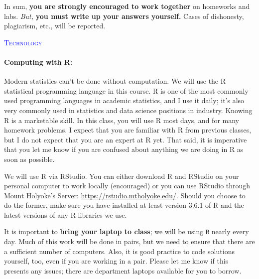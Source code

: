 \documentclass[12pt,a4paper]{article}
\begin{document}
In sum, \textbf{you are strongly encouraged to work together} on homeworks and labs. \emph{But,} \textbf{you must write up your answers yourself.} Cases of dishonesty, plagiarism, etc., will be reported.



\textcolor{blue}{\textsc{Technology}}

\paragraph{Computing with R:} Modern statistics can’t be done without computation. We will use the R statistical programming language in this course. R is one of the most commonly used programming languages in academic statistics, and I use it daily; it’s also very commonly used in statistics and data science positions in industry. Knowing R is a marketable skill. In this class, you will use R most days, and for many homework problems. I expect that you are familiar with R from previous classes, but I do not expect that you are an expert at R yet. That said, it is imperative  that you let me know if you are confused about anything we are doing in R as soon as possible.

We will use R via RStudio. You can either download R and RStudio on your personal computer to work locally (encouraged) or you can use RStudio through Mount Holyoke's Server: \url{https://rstudio.mtholyoke.edu/}. Should you choose to do the former, make sure you have installed at least version 3.6.1 of R and the latest versions of any R libraries we use.

It is important to \textbf{bring your laptop to class}; we will be using \texttt{R} nearly every day. Much of this work will be done in pairs, but we need to ensure that there are a sufficient number of computers. Also, it is good practice to code solutions yourself, too, even if you are working in a pair. Please let me know if this presents any issues; there are department laptops available for you to borrow.

\vspace{2mm}
\end{document}
